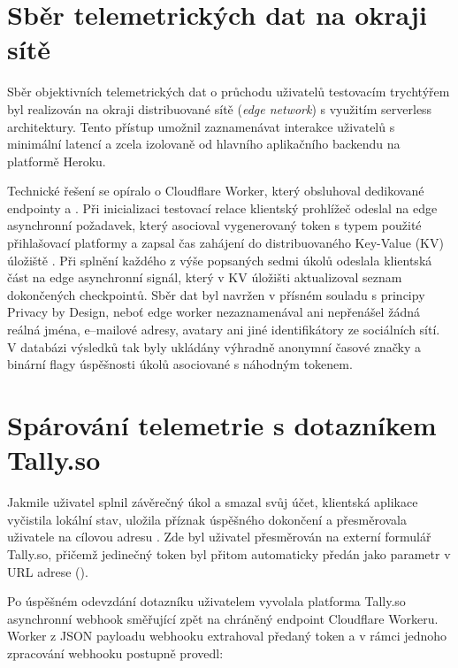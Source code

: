 \documentclass[male,czech,api_bc]{kitheses}
\begin{document}
\section{Sběr telemetrických dat na okraji sítě}
\label{sec:telemetrie_edge}

Sběr objektivních telemetrických dat o průchodu uživatelů testovacím trychtýřem byl realizován na okraji distribuované sítě (\textit{edge network}) s využitím serverless architektury. Tento přístup umožnil zaznamenávat interakce uživatelů s minimální latencí a zcela izolovaně od hlavního aplikačního backendu na platformě Heroku.

Technické řešení se opíralo o Cloudflare Worker, který obsluhoval dedikované endpointy  a   \cite{CloudflareDocsWorkers}. Při inicializaci testovací relace klientský prohlížeč odeslal na edge asynchronní požadavek, který asocioval vygenerovaný token  s typem použité přihlašovací platformy a zapsal čas zahájení do distribuovaného Key-Value (KV) úložiště  \cite{CloudflareDocsKV}. Při splnění každého z výše popsaných sedmi úkolů odeslala klientská část na edge asynchronní signál, který v KV úložišti aktualizoval seznam dokončených checkpointů. Sběr dat byl navržen v přísném souladu s principy Privacy by Design, neboť edge worker nezaznamenával ani nepřenášel žádná reálná jména, e--mailové adresy, avatary ani jiné identifikátory ze sociálních sítí. V databázi výsledků tak byly ukládány výhradně anonymní časové značky a binární flagy úspěšnosti úkolů asociované s náhodným tokenem.

\section{Spárování telemetrie s dotazníkem Tally.so}
\label{sec:sparovani_tally}

Jakmile uživatel splnil závěrečný úkol a smazal svůj účet, klientská aplikace vyčistila lokální stav, uložila příznak úspěšného dokončení a přesměrovala uživatele na cílovou adresu . Zde byl uživatel přesměrován na externí formulář Tally.so, přičemž jedinečný token byl přitom automaticky předán jako parametr v URL adrese ().

Po úspěšném odevzdání dotazníku uživatelem vyvolala platforma Tally.so asynchronní webhook směřující zpět na chráněný endpoint Cloudflare Workeru. Worker z JSON payloadu webhooku extrahoval předaný token a v rámci jednoho zpracování webhooku postupně provedl:
\end{document}
